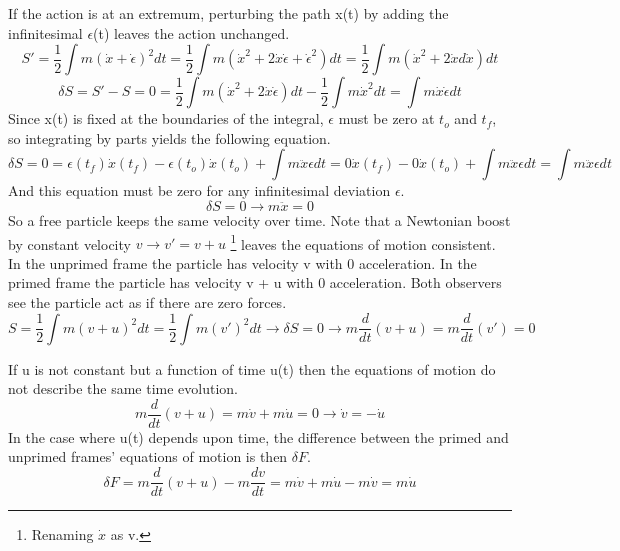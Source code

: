 If the action is at an extremum, perturbing the path x(t) by adding the infinitesimal $\epsilon$(t) leaves the action unchanged.
\begin{equation}
S' = \frac{1}{2} \int m(\dot{x} + \dot{\epsilon})^2 dt = \frac{1}{2} \int m(\dot{x}^2 + 2\dot{x}\dot{\epsilon} + \dot{\epsilon}^2) dt =  
\frac{1}{2} \int m(\dot{x}^2 + 2\dot{x}d\dot{x}) dt 
\end{equation}
\begin{equation}
\delta S = S' - S = 0 = \frac{1}{2} \int m(\dot{x}^2 + 2\dot{x}\dot{\epsilon}) dt - \frac{1}{2} \int m\dot{x}^2 dt = \int m\dot{x}\dot{\epsilon} dt
\end{equation}
Since x(t) is fixed at the boundaries of the integral, $\epsilon$ must be zero at $t_o$ and $t_f$, so integrating by parts yields the following equation. 
\begin{equation}
\delta S = 0 = \epsilon(t_f) \dot{x}(t_f)  - \epsilon(t_o) \dot{x}(t_o) + \int m\ddot{x} \epsilon dt  = 
0\dot{x}(t_f)  - 0\dot{x}(t_o) + \int m\ddot{x} \epsilon dt = \int m\ddot{x} \epsilon dt
\end{equation}
And this equation must be zero for any infinitesimal deviation $\epsilon$.
\begin{equation}
\delta S = 0 \rightarrow m\ddot{x} = 0
\end{equation}
So a free particle keeps the same velocity over time. Note that a Newtonian boost by constant velocity $v \rightarrow v' = v + u$ \footnote{Renaming $\dot{x}$ as v.} leaves the equations of motion consistent. In the unprimed frame the particle has velocity v with 0 acceleration. In the primed frame the particle has velocity v + u with 0 acceleration. Both observers see the particle act as if there are zero forces.
\begin{equation}
S = \frac{1}{2} \int m(v + u)^2 dt  =  \frac{1}{2} \int m(v')^2 dt \rightarrow \delta S = 0 \rightarrow m\frac{d}{dt}(v+u) = m\frac{d}{dt}(v') = 0 
\end{equation}

If u is not constant but a function of time u(t) then the equations of motion do not describe the same time evolution.
\begin{equation}
m\frac{d}{dt}(v+u) = m\dot{v} + m\dot{u} = 0 \rightarrow \dot{v} = -\dot{u}
\end{equation}
In the case where u(t) depends upon time, the difference between the primed and unprimed frames' equations of motion is then $\delta F$.
\begin{equation}
\delta F = m\frac{d}{dt}(v+u) - m\frac{dv}{dt} = m\dot{v} + m\dot{u} - m\dot{v} = m\dot{u}
\end{equation}

